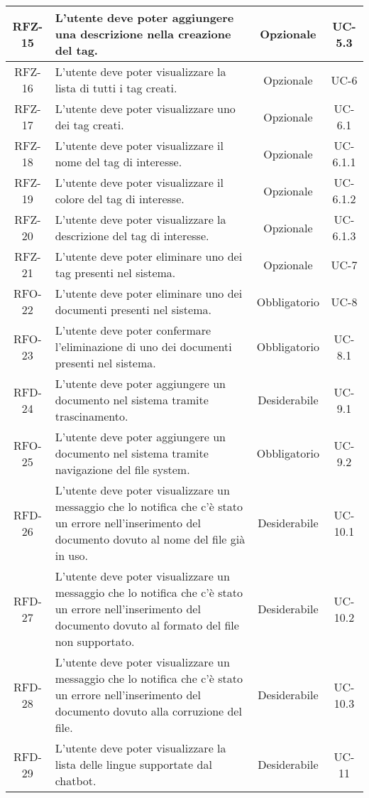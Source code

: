 \begin{xltabular}{\textwidth}{| c | X | c | c |}
    \hline
    RFZ-15 & L’utente deve poter aggiungere una descrizione nella creazione del tag. & Opzionale & UC-5.3 \\
    \hline
    RFZ-16 & L’utente deve poter visualizzare la lista di tutti i tag creati. & Opzionale & UC-6 \\
    \hline
    RFZ-17 & L’utente deve poter visualizzare uno dei tag creati. & Opzionale & UC-6.1 \\
    \hline
    RFZ-18 & L’utente deve poter visualizzare il nome del tag di interesse. & Opzionale & UC-6.1.1 \\
    \hline
    RFZ-19 & L’utente deve poter visualizzare il colore del tag di interesse. & Opzionale & UC-6.1.2 \\
    \hline
    RFZ-20 & L’utente deve poter visualizzare la descrizione del tag di interesse. & Opzionale & UC-6.1.3 \\
    \hline
    RFZ-21 & L’utente deve poter eliminare uno dei tag presenti nel sistema. & Opzionale & UC-7 \\
    \hline
    RFO-22 & L’utente deve poter eliminare uno dei documenti presenti nel sistema. & Obbligatorio & UC-8 \\
    \hline
    RFO-23 & L’utente deve poter confermare l’eliminazione di uno dei documenti presenti nel sistema. & Obbligatorio & UC-8.1 \\
    \hline
    RFD-24 & L’utente deve poter aggiungere un documento nel sistema tramite trascinamento. & Desiderabile & UC-9.1 \\
    \hline
    RFO-25 & L’utente deve poter aggiungere un documento nel sistema tramite navigazione del file system. & Obbligatorio & UC-9.2 \\
    \hline
    RFD-26 & L'utente deve poter visualizzare un messaggio che lo notifica che c'è stato un errore nell'inserimento del documento dovuto al nome del file già in uso. & Desiderabile & UC-10.1 \\
    \hline
    RFD-27 & L'utente deve poter visualizzare un messaggio che lo notifica che c'è stato un errore nell'inserimento del documento dovuto al formato del file non supportato. & Desiderabile & UC-10.2 \\
    \hline
    RFD-28 & L'utente deve poter visualizzare un messaggio che lo notifica che c'è stato un errore nell'inserimento del documento dovuto alla corruzione del file. & Desiderabile & UC-10.3 \\
    \hline
    RFD-29 & L’utente deve poter visualizzare la lista delle lingue supportate dal chatbot. & Desiderabile & UC-11 \\

\end{xltabular}
